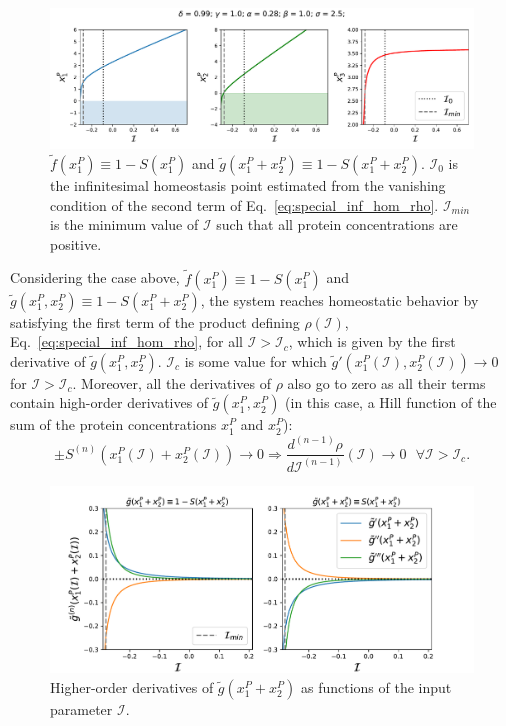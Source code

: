 \begin{figure}[H]
    \centering
    \includegraphics[scale=0.5]{figs/numerics/satfff_twoinput_ex1.pdf}
    \caption{$\tilde{f}(x_1^P) \equiv 1 - S(x_1^P)$ and $\tilde{g}(x_1^P + x_2^P) \equiv 1 - S(x_1^P + x_2^P)$. 
    $\mathcal{I}_0$ is the infinitesimal homeostasis point estimated from the vanishing condition of the 
    second term of Eq.~\ref{eq:special_inf_hom_rho}. $\mathcal{I}_{min}$ is the minimum value of $\mathcal{I}$
    such that all protein concentrations are positive.}
    \label{fig:sat_ex1}
\end{figure}

Considering the case above, $\tilde{f}(x_1^P) \equiv 1 - S(x_1^P)$ and 
$\tilde{g}(x_1^P, x_2^P) \equiv 1 - S(x_1^P + x_2^P)$, 
the system reaches homeostatic behavior by satisfying the first term of the product defining 
$\rho(\mathcal{I})$, Eq.~\ref{eq:special_inf_hom_rho}, for all $\mathcal{I} > \mathcal{I}_c$, 
which is given by the first derivative of $\tilde{g}(x_1^P, x_2^P)$. $\mathcal{I}_c$ is some value 
for which $\tilde{g}'(x_1^P(\mathcal{I}), x_2^P(\mathcal{I})) \rightarrow 0$ for 
$\mathcal{I} > \mathcal{I}_c$. Moreover, all the 
derivatives of $\rho$ also go to zero as all their terms contain high-order derivatives 
of $\tilde{g}(x_1^P, x_2^P)$ (in this case, a Hill function of the sum of the protein 
concentrations 
$x_1^P$ and $x_2^P$): 
\begin{equation}
    \pm S^{(n)}(x_1^P(\mathcal{I}) + x_2^P(\mathcal{I})) \rightarrow 0 \Rightarrow 
    \frac{d^{(n-1)}\rho}{d\mathcal{I}^{(n-1)}}(\mathcal{I}) \rightarrow 0 \ \ \  \forall \mathcal{I} > \mathcal{I}_c.
\end{equation}

\begin{figure}[H]
    \centering
    \includegraphics[scale=0.6]{figs/numerics/satfff_derivatives_g.pdf}
    \caption{Higher-order derivatives of $\tilde{g}(x_1^P + x_2^P)$ as functions of the input 
    parameter $\mathcal{I}$.}
    \label{fig:sat_ex1}
\end{figure}
